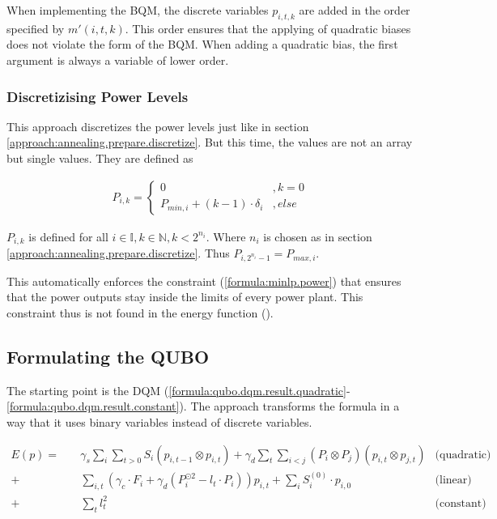 When implementing the BQM, the discrete variables $p_{i, t, k}$ are added in the order specified by $m'(i, t, k)$.
This order ensures that the applying of quadratic biases does not violate the form of the BQM.
When adding a quadratic bias, the first argument is always a variable of lower order.

\subsubsection{Discretizising Power Levels}

This approach discretizes the power levels just like in section \ref{approach:annealing.prepare.discretize}.
But this time, the values are not an array but single values.
They are defined as

\begin{align}
  P_{i, k} = \begin{cases}
    0 & , k = 0 \\
    P_{min, i} + (k - 1) \cdot \delta_i & , else
  \end{cases}
\end{align}

$P_{i, k}$ is defined for all $i \in \mathbb{I}, k \in \mathbb{N}, k < 2^{n_i}$.
Where $n_i$ is chosen as in section \ref{approach:annealing.prepare.discretize}.
Thus $P_{i, 2^{n_i} - 1} = P_{max, i}$.

This automatically enforces the constraint (\ref{formula:minlp.power}) that ensures that the power outputs stay inside the limits of every power plant.
This constraint thus is not found in the energy function ().

\subsection{Formulating the QUBO}

The starting point is the DQM (\ref{formula:qubo.dqm.result.quadratic}-\ref{formula:qubo.dqm.result.constant}).
The approach transforms the formula in a way that it uses binary variables instead of discrete variables.

\begin{subequations}
\begin{align}
  E(p) = \quad
  &
  \gamma_s \sum_i \sum_{t > 0} S_i \left( p_{i, t-1} \otimes p_{i, t} \right)
  + \gamma_d \sum_t \sum_{i < j} \left( P_i \otimes P_j \right) \left( p_{i, t} \otimes p_{j, t} \right)
  & \text{(quadratic)}
  \label{formula:qubo.dqm.result.quadratic}
  \\ + \quad &
  \sum_{i, t} \left(
    \gamma_c \cdot F_i + \gamma_d \left(P_i^{\odot 2} - l_t \cdot P_i \right)
  \right) p_{i, t}
  + \sum_i S_i^{(0)} \cdot p_{i, 0}
  & \text{(linear)}
  \label{formula:qubo.dqm.result.linear}
  \\ + \quad &
  \sum_t l_t^2
  & \text{(constant)}
  \label{formula:qubo.dqm.result.constant}
\end{align}
\end{subequations}

